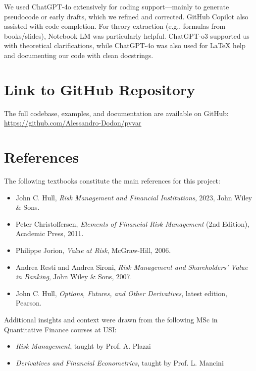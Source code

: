 \documentclass{article}
\begin{document}
We used ChatGPT-4o extensively for coding support—mainly to generate pseudocode or early drafts, which we refined and corrected. GitHub Copilot also assisted with code completion. For theory extraction (e.g., formulas from books/slides), Notebook LM was particularly helpful.  
ChatGPT-o3 supported us with theoretical clarifications, while ChatGPT-4o was also used for LaTeX help and documenting our code with clean docstrings.


\section{Link to GitHub Repository}

The full codebase, examples, and documentation are available on GitHub:  
\url{https://github.com/Alessandro-Dodon/pyvar}

\section{References}

The following textbooks constitute the main references for this project:

\begin{itemize}
  \item John C. Hull, \textit{Risk Management and Financial Institutions}, 2023, John Wiley \& Sons.
  \item Peter Christoffersen, \textit{Elements of Financial Risk Management} (2nd Edition), Academic Press, 2011.
  \item Philippe Jorion, \textit{Value at Risk}, McGraw-Hill, 2006.
  \item Andrea Resti and Andrea Sironi, \textit{Risk Management and Shareholders’ Value in Banking}, John Wiley \& Sons, 2007.
  \item John C. Hull, \textit{Options, Futures, and Other Derivatives}, latest edition, Pearson.
\end{itemize}

\vspace{1em}

Additional insights and context were drawn from the following MSc in Quantitative Finance courses at USI:

\begin{itemize}
  \item \textit{Risk Management}, taught by Prof. A. Plazzi
  \item \textit{Derivatives and Financial Econometrics}, taught by Prof. L. Mancini
\end{itemize}
\end{document}
